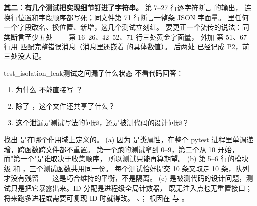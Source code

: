 \textbf{其二：有几个测试把实现细节钉进了字符串。}
 第 7--27 行逐字符断言  的输出，
连换行位置和字段顺序都写死；同文件第 71 行断言一整条 JSON 字面量。
 里任何一个字段改名、换位置、新增，这几个测试立刻红。
要更正一个流传的说法：同类断言至少五处——
 第 16--26、42--52、71 行三处黄金字面量，
外加  第 51、67 行用 
匹配完整错误消息（消息里还嵌着  的具体数值）。
后两处  已经记成 P2，前三处没人记。

\begin{checkpoint}{test_isolation_leak}{测试之间漏了什么状态}
不看代码回答：
\begin{enumerate}[label=(\alph*)]
  \item 为什么  不能直接写
        ？
  \item 除了 ，这个文件还共享了什么？
  \item 这个泄漏是测试写法的问题，还是被测代码的设计问题？
\end{enumerate}
\hint 找出  是在哪个作用域上定义的。
\ifshowanswers
\tcblower
\answer (a) 因为  是类属性，在整个 pytest 进程里单调递增，跨函数跨文件都不重置。
第一个跑的测试拿到 0--9，第二个从 10 开始，而"第一个"是谁取决于收集顺序，
所以测试只能再算期望。
(b) 第 5--6 行的模块级  和 ，三个测试函数共用同一份。
每个测试恰好提交 10 条又取走 10 条，队列才没有残留——这是巧合维持的平衡，不是隔离。
(c) 是被测代码的设计问题，测试只是把它暴露出来。ID 分配是进程级全局计数器，
既无注入点也无重置接口；将来跑多进程或需要可复现 ID 时就得改。
\whereincode {}、；
根因在  与
。
\fi
\end{checkpoint}

